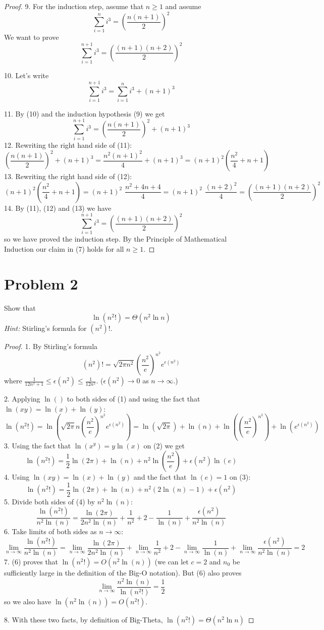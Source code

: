 \documentclass[14pt]{extarticle}
\begin{document}
\begin{proof}
9. For the induction step, assume that $n \geq 1$ and assume 
$$
\sum_{i = 1}^{n}i^3 = \left(\frac{n(n+1)}{2}\right)^2
$$
We want to prove
$$
\sum_{i = 1}^{n+1}i^3 = \left(\frac{(n+1)(n+2)}{2}\right)^2
$$

10. Let's write
$$
\sum_{i = 1}^{n+1}i^3 = \sum_{i = 1}^{n}i^3 + (n+1)^3
$$

11. By (10) and the induction hypothesis (9) we get
$$
\sum_{i = 1}^{n+1}i^3 = \left(\frac{n(n+1)}{2}\right)^2 + (n+1)^3
$$
12. Rewriting the right hand side of (11):
$$
\left(\frac{n(n+1)}{2}\right)^2 + (n+1)^3 = \frac{n^2(n+1)^2}{4} + (n+1)^3 = (n+1)^2\left(\frac{n^2}{4} + n + 1\right)
$$
13. Rewriting the right hand side of (12):
$$
(n+1)^2\left(\frac{n^2}{4} + n + 1\right) = (n+1)^2\,\,\frac{n^2 + 4n + 4}{4} = (n+1)^2\,\,\frac{(n+2)^2}{4} = \left(\frac{(n+1)(n+2)}{2}\right)^2
$$
14. By (11), (12) and (13) we have
$$
\sum_{i = 1}^{n+1}i^3 = \left(\frac{(n+1)(n+2)}{2}\right)^2
$$
so we have proved the induction step. By the Principle of Mathematical Induction our claim in (7) holds for all $n \geq 1$.
\end{proof}

\section{Problem 2}
Show that
$$
\ln(n^2!) = \Theta(n^2\ln n)
$$
{\it Hint:} Stirling's formula for $(n^2)!$.
\begin{proof}
1. By Stirling's formula
$$
(n^2)! = \sqrt{2\pi n^2}\left(\frac{n^2}{e}\right)^{n^2} e^{\epsilon(n^2)}
$$
where $\frac{1}{12n^2+1}\leq\epsilon(n^2)\leq\frac{1}{12n^2}$. ($\epsilon(n^2) \to 0$ as $n \to \infty$.)

2. Applying $\ln()$ to both sides of (1) and using the fact that $\ln(xy) = \ln(x) + \ln(y)$:
$$
\ln(n^2!) = \ln(\sqrt{2\pi}n\left(\frac{n^2}{e}\right)^{n^2} e^{\epsilon(n^2)}) = \ln(\sqrt{2\pi}) + \ln(n) + \ln(\left(\frac{n^2}{e}\right)^{n^2}) + \ln(e^{\epsilon(n^2)})
$$
3. Using the fact that $\ln(x^y) = y\ln(x)$ on (2) we get
$$
\ln(n^2!) = \frac{1}{2}\ln(2\pi) + \ln(n) + n^2\ln(\frac{n^2}{e}) + \epsilon(n^2)\ln(e)
$$
4. Using $\ln(xy) = \ln(x) + \ln(y)$ and the fact that $\ln(e) = 1$ on (3):
$$
\ln(n^2!) = \frac{1}{2}\ln(2\pi) + \ln(n) + n^2(2\ln(n) - 1) + \epsilon(n^2)
$$
5. Divide both sides of (4) by $n^2\ln(n)$:
$$
\frac{\ln(n^2!)}{n^2\ln(n)} = \frac{\ln(2\pi)}{2n^2\ln(n)} + \frac{1}{n^2} + 2 - \frac{1}{\ln(n)} + \frac{\epsilon(n^2)}{n^2\ln(n)}
$$
6. Take limits of both sides as $n \to \infty$:
$$
\lim_{n \to \infty}\frac{\ln(n^2!)}{n^2\ln(n)} = \lim_{n \to \infty}\frac{\ln(2\pi)}{2n^2\ln(n)} + \lim_{n \to \infty}\frac{1}{n^2} + 2 - \lim_{n \to \infty}\frac{1}{\ln(n)} + \lim_{n \to \infty}\frac{\epsilon(n^2)}{n^2\ln(n)} = 2
$$
7. (6) proves that $\ln(n^2!) = O(n^2\ln(n))$ (we can let $c = 2$ and $n_0$ be sufficiently large in the definition of the Big-O notation). But (6) also proves
$$
\lim_{n \to \infty}\frac{n^2\ln(n)}{\ln(n^2!)} = \frac{1}{2}
$$
so we also have $\ln(n^2\ln(n)) = O(n^2!)$. 

8. With these two facts, by definition of Big-Theta, $\ln(n^2!) = \Theta(n^2\ln n)$
\end{proof}
\end{document}
